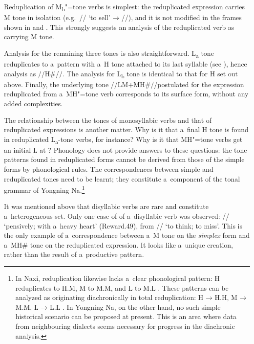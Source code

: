 Reduplication of M\textsubscript{b}"=tone verbs is simplest: the reduplicated expression carries M tone in isolation (e.g.~// ‘to sell’ → //), and it is not modified in the frames shown in  and . This strongly suggests an analysis of the reduplicated verb as carrying M tone.

Analysis for the remaining three tones is also straightforward. L\textsubscript{a} tone reduplicates to a~pattern with a~H tone attached to its last syllable (see ), hence analysis as \mbox{//H\#//}. The analysis for L\textsubscript{b} tone is identical to that for H set out above. Finally, the underlying tone //LM+MH\#//postulated for the expression reduplicated from a~MH"=tone verb corresponds to its surface form, without any added complexities.
 
\largerpage[-1] 
The relationship between the tones of monosyllabic verbs and that of reduplicated expressions is another matter. Why is it that a~final H tone is found in reduplicated L\textsubscript{a}-tone verbs, for instance? Why is it that MH"=tone verbs get an initial L at ? Phonology does not provide answers to these questions: the tone patterns found in reduplicated forms cannot be derived from those of the simple forms by phonological rules. The
correspondences between simple and reduplicated tones need to be learnt; they
constitute a~component of the tonal grammar of Yongning Na.\footnote{In {Naxi}, {reduplication} likewise lacks a~clear phonological pattern: H reduplicates to H.M, M to M.M, and L to M.L \citep[10-11]{he1987}. These patterns can be analyzed as originating diachronically in total {reduplication}: H → H.H, M → M.M, L → L.L \citep{michaudetal2007c}. In Yongning Na, on the other hand, no such simple historical scenario can be proposed at present. This is an area where data from neighbouring dialects seems necessary for progress in the {diachronic} analysis.}

It was mentioned above that disyllabic verbs are rare and constitute a~heterogeneous set. Only one case of  of a~disyllabic verb was observed: //
‘pensively; with a~heavy heart’ (Reward.49), from // ‘to think; to miss’. This is the only example of
a~{correspondence} between a~M tone on the \textit{simplex} form and a~MH\# tone on the reduplicated
expression. It looks
like a~unique creation, rather than the result of a~productive pattern.


